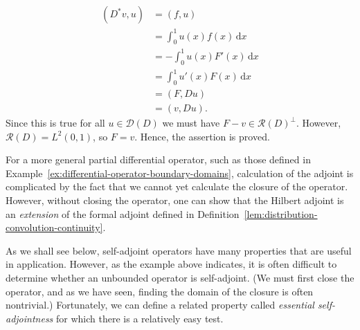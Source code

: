 \begin{Example}
\[\begin{aligned}
(D^*v,u)&=(f,u)\\
&=\int_0^1u(x)f(x)\,\mathrm{d}x\\
&=-\int_0^1u(x)F'(x)\,\mathrm{d}x\\
&=\int_0^1u'(x)F(x)\,\mathrm{d}x\\
&=(F,Du)\\
&=(v,Du).
\end{aligned}\]Since this is true for all $u\in\mathcal{D}(D)$ we must have $F-v\in\mathcal{R}(D)^\perp$. However, $\mathcal{R}(D)=L^2(0,1)$, so $F=v$. Hence, the assertion is proved.
\end{Example}

\begin{Example}
\label{ex:general-differential-hilbert-formal-adjoint}
For a more general partial differential operator, such as those defined in Example~\ref{ex:differential-operator-boundary-domains}, calculation of the adjoint is complicated by the fact that we cannot yet calculate the closure of the operator. However, without closing the operator, one can show that the Hilbert adjoint is an \emph{extension} of the formal adjoint defined in Definition~\ref{lem:distribution-convolution-continuity}.
\end{Example}

As we shall see below, self-adjoint operators have many properties that are useful in application. However, as the example above indicates, it is often difficult to determine whether an unbounded operator is self-adjoint. (We must first close the operator, and as we have seen, finding the domain of the closure is often nontrivial.) Fortunately, we can define a related property called \emph{essential self-adjointness} for which there is a relatively easy test.
